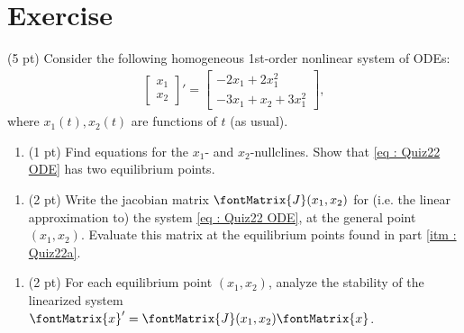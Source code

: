 %
%
%
%
\section{Exercise}

(5 pt) Consider the following homogeneous 1st-order nonlinear system of ODEs:
\begin{align}
\begin{bmatrix}%
x_{1}	\\
x_{2}
\end{bmatrix}%
'
=
\begin{bmatrix}%
-2 x_{1} + 2 x_{1}^{2}		\\
-3 x_{1} + x_{2} + 3 x_{1}^{2}
\end{bmatrix}%
,%
\label{eq : Quiz22 ODE}
\end{align}
where $x_{1}(t),x_{2}(t)$ are functions of $t$ (as usual).

\begin{enumerate}[label=(\alph*)]
\item\label{itm : Quiz22a} (1 pt) Find equations for the $x_{1}$- and $x_{2}$-nullclines. Show that \eqref{eq : Quiz22 ODE} has two equilibrium points.
\end{enumerate}

\spaceSolution{1in}{%
}%

\begin{enumerate}[resume,label=(\alph*)]
\item\label{itm : Quiz22b} (2 pt) Write the jacobian matrix $\fontMatrix{J}(x_{1},x_{2})$ for (i.e. the linear approximation to) the system \eqref{eq : Quiz22 ODE}, at the general point $(x_{1},x_{2})$. Evaluate this matrix at the equilibrium points found in part \ref{itm : Quiz22a}.
\end{enumerate}

\spaceSolution{1.5in}{%
}%

\begin{enumerate}[resume,label=(\alph*)]
\item\label{itm : Quiz22c} (2 pt) For each equilibrium point $(x_{1},x_{2})$, analyze the stability of the linearized system $\fontMatrix{x}' = \fontMatrix{J}(x_{1},x_{2}) \fontMatrix{x}$. 
\end{enumerate}

\spaceSolution{2in}{%
}%